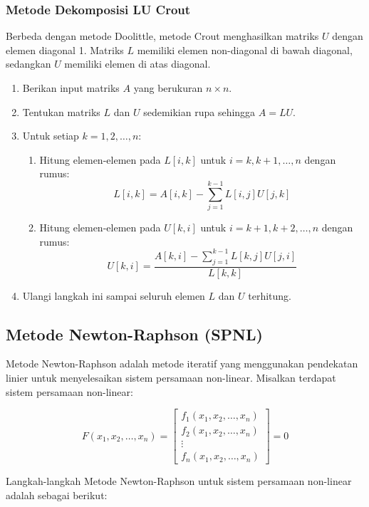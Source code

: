 \documentclass[a4paper,extrafontsizes, 9pt]{memoir}
\begin{document}
\begin{multicols}{3}
        \subsubsection*{\small Metode Dekomposisi LU Crout}
        Berbeda dengan metode Doolittle, metode Crout menghasilkan matriks \(U\) dengan elemen diagonal 1. Matriks \(L\) memiliki elemen non-diagonal di bawah diagonal, sedangkan \(U\) memiliki elemen di atas diagonal.
        \begin{enumerate}
          \item Berikan input matriks \(A\) yang berukuran \(n \times n\).
          \item Tentukan matriks \(L\) dan \(U\) sedemikian rupa sehingga \(A = LU\).
          \item Untuk setiap \(k = 1, 2, \dots, n\):
          \begin{enumerate}
              \item Hitung elemen-elemen pada \(L[i,k]\) untuk \(i = k, k+1, \dots, n\) dengan rumus:
              \[
              L[i,k] = A[i,k] - \sum_{j=1}^{k-1} L[i,j]U[j,k]
              \]
              \item Hitung elemen-elemen pada \(U[k,i]\) untuk \(i = k+1, k+2, \dots, n\) dengan rumus:
              \[
              U[k,i] = \frac{A[k,i] - \sum_{j=1}^{k-1} L[k,j]U[j,i]}{L[k,k]}
              \]
          \end{enumerate}
          \item Ulangi langkah ini sampai seluruh elemen \(L\) dan \(U\) terhitung.
      \end{enumerate}
        \subsection*{\small Metode Newton-Raphson (SPNL)}
        Metode Newton-Raphson adalah metode iteratif yang menggunakan pendekatan linier untuk menyelesaikan sistem persamaan non-linear. Misalkan terdapat sistem persamaan non-linear:

        \[
        F(x_1, x_2, \dots, x_n) = \begin{bmatrix} f_1(x_1, x_2, \dots, x_n) \\ f_2(x_1, x_2, \dots, x_n) \\ \vdots \\ f_n(x_1, x_2, \dots, x_n) \end{bmatrix} = 0
        \]

        Langkah-langkah Metode Newton-Raphson untuk sistem persamaan non-linear adalah sebagai berikut:


\end{multicols}
\end{document}
